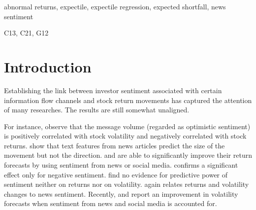 \documentclass[11pt]{article}
\begin{document}
\begin{keywords}
abnormal returns, expectile, expectile regression, expected shortfall, news sentiment
\end{keywords}
\begin{JEL}
C13, C21, G12
\end{JEL}

\newpage
{} %

\hypertarget{introduction}{%
\section*{Introduction}\label{introduction}}

Establishing the link between investor sentiment associated with certain information flow channels and stock return movements has captured the attention of many researches. The results are still somewhat unaligned.

For instance, \cite{DAS2007} observe that the message volume (regarded as optimistic sentiment) is positively correlated with stock volatility and negatively correlated with stock returns. \cite{luss2009} show that text features from news articles predict the size of the movement but not the direction. \cite{HAGENAU2013} and \cite{NGUYEN2015} are able to significantly improve their return forecasts by using sentiment from news or social media. \cite{SHANG2014} confirms a significant effect only for negative sentiment.  \cite{KIM2014} find no evidence for predictive power of sentiment neither on returns nor on volatility. \cite{smales2016} again relates returns and volatility changes to news sentiment. Recently, \cite{AUDRINO2020} and \cite{FANG2021} report an improvement in volatility forecasts when sentiment from news and social media is accounted for.
\end{document}
